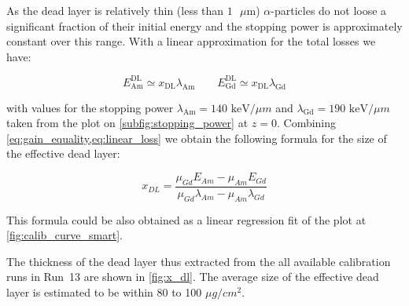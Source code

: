 \documentclass[a4paper,12pt]{article}
\begin{document}
As the dead layer is relatively thin (less than $1\text{ }\mu\text{m}$)
$\alpha$-particles do not loose a significant fraction of their initial energy
and the stopping power is approximately constant over this range. With a linear
approximation for the total losses we have:

\begin{equation}
E^\text{DL}_\text{Am} \simeq x_\text{DL} \lambda_\text{Am} \qquad
E^\text{DL}_\text{Gd} \simeq x_\text{DL} \lambda_\text{Gd}
\label{eq:linear_loss}
\end{equation}

\noindent
with values for the stopping power $\lambda_\text{Am} = 140\text{ keV/}\mu m$
and $\lambda_\text{Gd} = 190\text{ keV/}\mu m$ taken from the plot on
\cref{subfig:stopping_power} at $z=0$. Combining \cref{eq:gain_equality,eq:linear_loss}
we obtain the following formula for the size of the effective dead layer:

\begin{equation}
x_{DL} = \frac{\mu_{Gd} E_{Am} - \mu_{Am} E_{Gd}}{\mu_{Gd}\lambda_{Am} - \mu_{Am}\lambda_{Gd}}
\label{eq:x_dl}
\end{equation}

This formula could be also obtained as a linear regression fit of the plot at
\cref{fig:calib_curve_smart}.

The thickness of the dead layer thus extracted from the all available
calibration runs in Run~13 are shown in \cref{fig:x_dl}. The average size
of the effective dead layer is estimated to be within 80 to 100 $\mu g/cm^2$.
\end{document}
